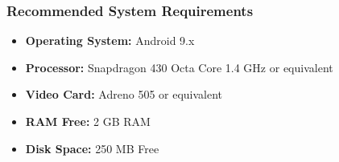 \subsubsection{Recommended System Requirements}

\begin {itemize}	
	\item \textbf{Operating System:} Android 9.x
	\item \textbf{Processor:} Snapdragon 430 Octa Core 1.4 GHz or equivalent
	\item \textbf{Video Card:}  Adreno 505 or equivalent
	\item \textbf{RAM Free:}  2 GB RAM
	\item \textbf{Disk Space:} 250 MB Free

\end {itemize}

\pagebreak 